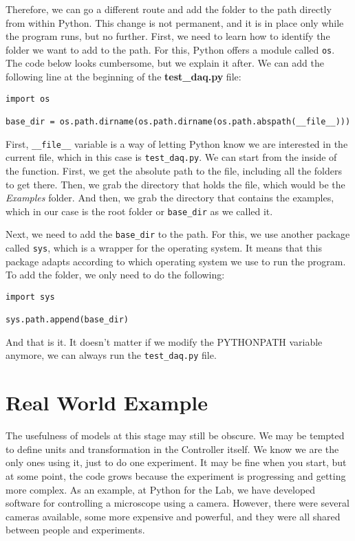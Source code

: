 Therefore, we can go a different route and add the folder to the path directly from within Python. This change is not permanent, and it is in place only while the program runs, but no further. First, we need to learn how to identify the folder we want to add to the path. For this, Python offers a module called \texttt{os}. The code below looks cumbersome, but we explain it after. We can add the following line at the beginning of the \textbf{test\_daq.py} file:

\begin{verbatim}
import os

base_dir = os.path.dirname(os.path.dirname(os.path.abspath(__file__)))
\end{verbatim}

First, \texttt{\_\_file\_\_} variable is a way of letting Python know we are interested in the current file, which in this case is \texttt{test\_daq.py}. We can start from the inside of the function. First, we get the absolute path to the file, including all the folders to get there. Then, we grab the directory that holds the file, which would be the \emph{Examples} folder. And then, we grab the directory that contains the examples, which in our case is the root folder or \texttt{base\_dir} as we called it.

Next, we need to add the \texttt{base\_dir} to the path. For this, we use another package called \texttt{sys}, which is a wrapper for the operating system. It means that this package adapts according to which operating system we use to run the program. To add the folder, we only need to do the following:

\begin{verbatim}
import sys

sys.path.append(base_dir)
\end{verbatim}

And that is it. It doesn't matter if we modify the PYTHONPATH variable anymore, we can always run the \texttt{test\_daq.py} file.


\section{Real World Example}\label{sec:real-world-model}
The usefulness of models at this stage may still be obscure. We may be tempted to define units and transformation in the Controller itself. We know we are the only ones using it, just to do one experiment. It may be fine when you start, but at some point, the code grows because the experiment is progressing and getting more complex. As an example, at Python for the Lab, we have developed software for controlling a microscope using a camera. However, there were several cameras available, some more expensive and powerful, and they were all shared between people and experiments.

